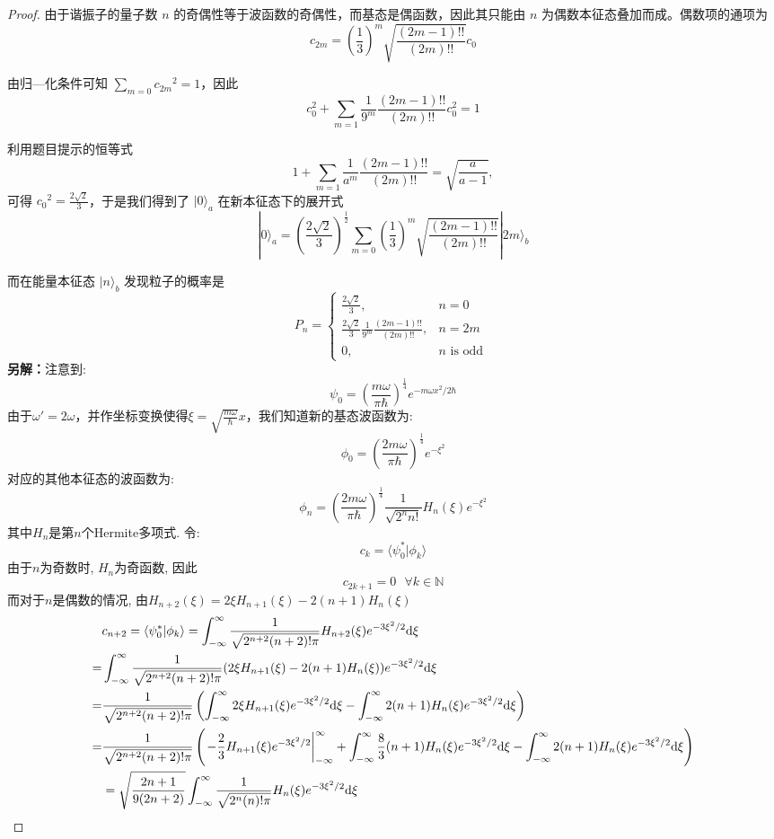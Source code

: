 \begin{proof}
由于谐振子的量子数 $n$ 的奇偶性等于波函数的奇偶性，而基态是偶函数，因此其只能由 $n$ 为偶数本征态叠加而成。偶数项的通项为
$$c_{2m}=\left(\frac{1}{3}\right)^{m} \sqrt{\frac{(2m-1)!!}{(2m)!!}} c_{0}$$

由归—化条件可知 $\sum_{m=0} c_{2 m}{ }^{2}=1$，因此
$$c_{0}^{2}+\sum_{m=1} \frac{1}{9^{m}} \frac{(2m-1)!!}{(2m)!!} c_{0}^{2}=1$$

利用题目提示的恒等式
\[1+\sum_{m=1} \frac{1}{a^{m}} \frac{(2 m-1)!!}{(2 m)!!}=\sqrt{\frac{a}{a-1}},\]
可得 $c_{0}{ }^{2}=\frac{2 \sqrt{2}}{3}$，于是我们得到了 $|0\rangle_{a}$ 在新本征态下的展开式
$$|0\rangle_{a}=\left(\frac{2 \sqrt{2}}{3}\right)^{\frac{1}{2}} \sum_{m=0}\left(\frac{1}{3}\right)^{m} \sqrt{\frac{(2m-1)!!}{(2m)!!}}|2 m\rangle_{b}$$

而在能量本征态 $|n\rangle_{b}$ 发现粒子的概率是
$$P_{n}= \begin{cases}\frac{2 \sqrt{2}}{3}, & n=0 \\ \frac{2 \sqrt{2}}{3} \frac{1}{9^{m}} \frac{(2m-1)!!}{(2m)!!}, & n=2m \\ 0, & n \text { is odd }\end{cases}$$
\textbf{另解：}注意到:
\[
    \psi_0=\left(\frac{m\omega}{\pi\hbar}\right)^{\frac{1}{4}}e^{-m\omega x^2/2\hbar}
\]
由于$\omega'=2\omega$，并作坐标变换使得$\xi=\sqrt{\frac{m\omega}{\hbar}}x$，我们知道新的基态波函数为:
\[
    \phi_0=\left(\frac{2m\omega}{\pi\hbar}\right)^{\frac{1}{4}}e^{-\xi^2}
\]
对应的其他本征态的波函数为:
\[
    \phi_n=\left(\frac{2m\omega}{\pi\hbar}\right)^{\frac{1}{4}}\frac{1}{\sqrt{2^n n!}}H_n(\xi)e^{-\xi^2}
\]
其中$H_n$是第$n$个Hermite多项式. 
令:
\[
    c_k=\langle\psi_0^*|\phi_k\rangle
\]
由于$n$为奇数时, $H_n$为奇函数, 因此
\[
    c_{2k+1}=0 \ \ \ \forall k\in \mathbb{N}
\]
而对于$n$是偶数的情况, 由$H_{n+2}(\xi)=2\xi H_{n+1}(\xi)-2(n+1)H_n(\xi)$
\begin{align*}
    &c_{n+2}=\langle\psi_0^*|\phi_k\rangle=\int_{-\infty}^\infty \frac{1}{\sqrt{2^{n+2} (n+2)!\pi}} H_{n+2}(\xi)e^{-3\xi^2/2}\textnormal{d}\xi \\
    =&\int_{-\infty}^\infty \frac{1}{\sqrt{2^{n+2} (n+2)!\pi}} (2\xi H_{n+1}(\xi)-2(n+1)H_n(\xi))e^{-3\xi^2/2}\textnormal{d}\xi \\
    =& \frac{1}{\sqrt{2^{n+2} (n+2)!\pi}} \left(\int_{-\infty}^\infty 2\xi H_{n+1}(\xi)e^{-3\xi^2/2}\textnormal{d}\xi-\int_{-\infty}^\infty2(n+1)H_n(\xi)e^{-3\xi^2/2}\textnormal{d}\xi \right) \\
    =&\frac{1}{\sqrt{2^{n+2} (n+2)!\pi}} \left( \left.-\frac{2}{3} H_{n+1}(\xi)e^{-3\xi^2/2}\right|^\infty_{-\infty}+\int_{-\infty}^\infty\frac{8}{3}(n+1)H_n(\xi)e^{-3\xi^2/2}\textnormal{d}\xi-\int_{-\infty}^\infty2(n+1)H_n(\xi)e^{-3\xi^2/2}\textnormal{d}\xi \right)\\
    &=\sqrt{\frac{2n+1}{9(2n+2)}}\int_{-\infty}^\infty \frac{1}{\sqrt{2^{n} (n)!\pi}} H_{n}(\xi)e^{-3\xi^2/2}\textnormal{d}\xi
\end{align*}


\end{proof}

